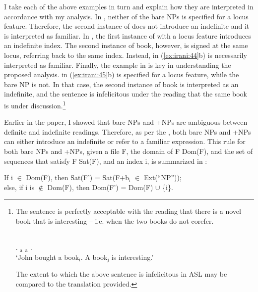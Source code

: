 \documentclass[output=paper,
modfonts
]{langscibook}
\begin{document}
I take each of the above examples in turn and explain how they are interpreted in accordance with my analysis. In , neither of the bare NPs  is specified for a locus feature. Therefore, the second instance of  does not introduce an indefinite and it is interpreted as familiar. In , the first instance of  with a locus feature introduces an indefinite index. The second instance of book, however, is signed at the same locus, referring back to the same index. Instead,  in (\ref{ex:irani:44}b) is necessarily interpreted as familiar. Finally, the example in  is key in understanding the proposed analysis.  in (\ref{ex:irani:45}b) is specified for a locus feature, while the bare NP  is not. In that case, the second instance of book is interpreted as an indefinite, and the sentence is infelicitous under the reading that the same book is under discussion.\footnote{The sentence is perfectly acceptable with the reading that there is a novel book that is interesting -- i.e. when the two books do not corefer.  
	
	\ea {}\\
	\normalfont {}. $_\text{a}$ $_\text{a}$ .\\
		`John bought a book$_\text{i}$. A book$_\text{j}$ is interesting.'
	\z

The extent to which the above sentence is infelicitous in ASL may be compared to the  translation provided.} 

Earlier in the paper, I showed that bare NPs and +NPs are ambiguous between definite and indefinite readings. Therefore, as per the , both bare NPs and +NPs can either introduce an indefinite or refer to a familiar expression. This rule for both bare NPs and +NPs, given a file F, the domain of F Dom(F), and the set of sequences that satisfy F Sat(F), and an index i, is summarized in : 

\begin{exe}
\ex \label{ex:irani:46} If i \(\in\) Dom(F), then Sat(F') = Sat(F+b$_\text{i}$ \(\in\) Ext(``NP''));\\ else, if i is \(\notin\) Dom(F), then Dom(F') = Dom(F) \(\cup\) \{i\}. \par  
\end{exe}
\end{document}
